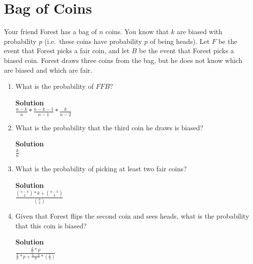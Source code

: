 \documentclass[11pt]{article}
\newcommand*{\Question}[1]{\section{#1}}
\newenvironment{Parts}{\begin{enumerate}[label=(\alph*)]}{\end{enumerate}}
\newcommand*{\Part}{\item}
\begin{document}
\Question{Bag of Coins}

Your friend Forest has a bag of $n$ coins. You know that $k$ are biased with
probability $p$ (i.e.\ these coins have probability $p$ of being heads). Let
$F$ be the event that Forest picks a fair coin, and let $B$ be the event that
Forest picks a biased coin. Forest draws three coins from the bag, but he does
not know which are biased and which are fair.

\begin{Parts}
\Part What is the probability of $FFB$?
\begin{mdframed} \textbf{Solution} \\
$\frac{n-k}{n}*\frac{n-k-1}{n-1}*\frac{k}{n-2}$
\end{mdframed}

\Part What is the probability that the third coin he draws is biased?
\begin{mdframed} \textbf{Solution} \\
$\frac{k}{n}$
\end{mdframed}

\Part What is the probability of picking at least two fair coins?
\begin{mdframed} \textbf{Solution} \\
$\frac{\binom{n-k}{2}*k+\binom{n-k}{3}}{\binom{n}{3}}$
\end{mdframed}

\Part Given that Forest flips the second coin and sees heads, what is the
probability that this coin is biased?
\begin{mdframed} \textbf{Solution} \\
$\frac{\frac{k}{n}*p}{\frac{k}{n}*p+\frac{n-k}{n}*(\frac{1}{2})}$
\end{mdframed}
\end{Parts}
\end{document}
